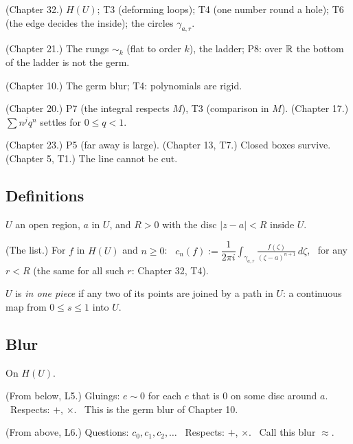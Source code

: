 \begin{lines}
\item[\lab{G1}] (Chapter 32.) $H(U)$; T3 (deforming loops); T4 (one number round a hole); T6 (the edge decides the inside); the circles $\gamma_{a,r}$.
\item[\lab{G2}] (Chapter 21.) The rungs $\sim_k$ (flat to order $k$), the ladder; P8: over $\mathbb{R}$ the bottom of the ladder is not the germ.
\item[\lab{G3}] (Chapter 10.) The germ blur; T4: polynomials are rigid.
\item[\lab{G4}] (Chapter 20.) P7 (the integral respects $M$), T3 (comparison in $M$). (Chapter 17.) $\sum n^j q^n$ settles for $0 \le q < 1$.
\item[\lab{G5}] (Chapter 23.) P5 (far away is large). (Chapter 13, T7.) Closed boxes survive. (Chapter 5, T1.) The line cannot be cut.
\end{lines}

\subsection*{Definitions}

\begin{lines}
\item[\lab{D1}] $U$ an open region, $a$ in $U$, and $R > 0$ with the disc $|z - a| < R$ inside $U$.
\item[\lab{D2}] (The list.) For $f$ in $H(U)$ and $n \ge 0$: \ $c_n(f) := \dfrac{1}{2\pi i} \displaystyle\int_{\gamma_{a,r}} \frac{f(\zeta)}{(\zeta - a)^{n+1}}\, d\zeta$, \ for any $r < R$ (the same for all such $r$: Chapter 32, T4).
\item[\lab{D3}] $U$ is \emph{in one piece} if any two of its points are joined by a path in $U$: a continuous map from $0 \le s \le 1$ into $U$.
\end{lines}

\subsection*{Blur}

On $H(U)$.

\begin{lines}
\item[\lab{B1}] (From below, L5.) Gluings: $e \sim 0$ for each $e$ that is $0$ on some disc around $a$. \ Respects: $+$, $\times$. \ This is the germ blur of Chapter 10.
\item[\lab{B2}] (From above, L6.) Questions: $c_0, c_1, c_2, \dots$ \ Respects: $+$, $\times$. \ Call this blur $\approx$.
\end{lines}

